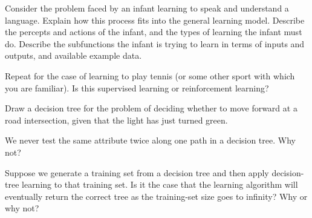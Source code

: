 
\begin{exercise}%
Consider the problem faced by an infant learning to speak and
understand a language. Explain how this process fits into the general
learning model. Describe the percepts and actions of the infant,
and the types of learning the infant must do. Describe the subfunctions
the infant is trying to learn in terms of inputs and outputs, and
available example data.
\end{exercise} 

\begin{exercise}
Repeat  for the case of learning to
play tennis (or some other  sport with which you are
familiar). Is this supervised learning or reinforcement
learning?
\end{exercise} 



\begin{iexercise}
Draw a decision tree for the problem of deciding whether  to
move forward at a road intersection, given that the light has just
turned green.
\end{iexercise} 

\begin{iexercise}
We never test the same attribute twice along one path in a
decision tree.  Why not?
\end{iexercise} 

\begin{exercise}
Suppose we generate a training set from a decision tree and then apply
decision-tree learning to that training set. Is it the case that the
learning algorithm will eventually return the correct tree as the
training-set size goes to infinity? Why or why not?
\end{exercise} 


